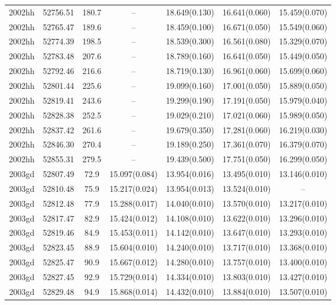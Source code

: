 \begin{table*}
\begin{tabular}{ccccccc}
2002hh	  & 52756.51	 & 180.7	& --	 & 18.649(0.130)	 & 16.641(0.060)	 & 15.459(0.070) \\ 
2002hh	  & 52765.47	 & 189.6	& --	 & 18.459(0.100)	 & 16.671(0.050)	 & 15.549(0.060) \\ 
2002hh	  & 52774.39	 & 198.5	& --	 & 18.539(0.300)	 & 16.561(0.080)	 & 15.329(0.070) \\ 
2002hh	  & 52783.48	 & 207.6	& --	 & 18.789(0.160)	 & 16.641(0.050)	 & 15.449(0.050) \\ 
2002hh	  & 52792.46	 & 216.6	& --	 & 18.719(0.130)	 & 16.961(0.060)	 & 15.699(0.060) \\ 
2002hh	  & 52801.44	 & 225.6	& --	 & 19.099(0.160)	 & 17.001(0.050)	 & 15.889(0.050) \\ 
2002hh	  & 52819.41	 & 243.6	& --	 & 19.299(0.190)	 & 17.191(0.050)	 & 15.979(0.040) \\ 
2002hh	  & 52828.38	 & 252.5	& --	 & 19.029(0.210)	 & 17.021(0.060)	 & 15.989(0.050) \\ 
2002hh	  & 52837.42	 & 261.6	& --	 & 19.679(0.350)	 & 17.281(0.060)	 & 16.219(0.030) \\ 
2002hh	  & 52846.30	 & 270.4	& --	 & 19.189(0.250)	 & 17.361(0.070)	 & 16.379(0.070) \\ 
2002hh	  & 52855.31	 & 279.5	& --	 & 19.439(0.500)	 & 17.751(0.050)	 & 16.299(0.050) \\ 
2003gd	  & 52807.49	 & 72.9	& 15.097(0.084)	 & 13.954(0.016)	 & 13.495(0.010)	 & 13.146(0.010) \\ 
2003gd	  & 52810.48	 & 75.9	& 15.217(0.024)	 & 13.954(0.013)	 & 13.524(0.010)	 & -- \\ 
2003gd	  & 52812.48	 & 77.9	& 15.288(0.017)	 & 14.040(0.010)	 & 13.570(0.010)	 & 13.217(0.010) \\ 
2003gd	  & 52817.47	 & 82.9	& 15.424(0.012)	 & 14.108(0.010)	 & 13.622(0.010)	 & 13.296(0.010) \\ 
2003gd	  & 52819.46	 & 84.9	& 15.453(0.011)	 & 14.142(0.010)	 & 13.647(0.010)	 & 13.293(0.010) \\ 
2003gd	  & 52823.45	 & 88.9	& 15.604(0.010)	 & 14.240(0.010)	 & 13.717(0.010)	 & 13.368(0.010) \\ 
2003gd	  & 52825.47	 & 90.9	& 15.667(0.012)	 & 14.280(0.010)	 & 13.757(0.010)	 & 13.400(0.010) \\ 
2003gd	  & 52827.45	 & 92.9	& 15.729(0.014)	 & 14.334(0.010)	 & 13.803(0.010)	 & 13.427(0.010) \\ 
2003gd	  & 52829.48	 & 94.9	& 15.868(0.014)	 & 14.432(0.010)	 & 13.884(0.010)	 & 13.507(0.010) \\ 

\end{tabular}
\end{table*}
